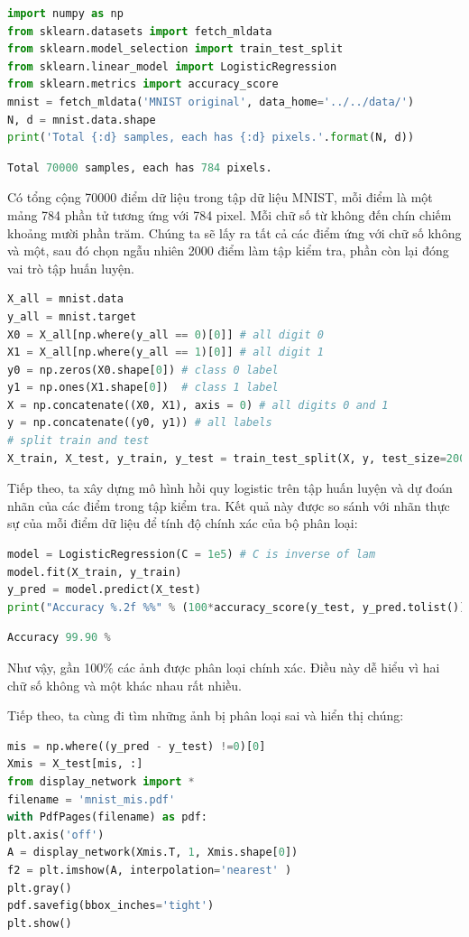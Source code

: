 \begin{lstlisting}[language=Python]
import numpy as np
from sklearn.datasets import fetch_mldata
from sklearn.model_selection import train_test_split
from sklearn.linear_model import LogisticRegression
from sklearn.metrics import accuracy_score
mnist = fetch_mldata('MNIST original', data_home='../../data/')
N, d = mnist.data.shape
print('Total {:d} samples, each has {:d} pixels.'.format(N, d))
\end{lstlisting}
\kq
\begin{lstlisting}[language=Python]
Total 70000 samples, each has 784 pixels.
\end{lstlisting}

Có tổng cộng 70000 điểm dữ liệu trong tập dữ liệu MNIST, mỗi điểm là một mảng
784 phần tử tương ứng với 784 pixel. Mỗi chữ số từ không đến chín chiếm khoảng
mười phần trăm. Chúng ta sẽ lấy ra tất cả các điểm ứng với chữ số không và một,
sau đó chọn ngẫu nhiên 2000 điểm làm tập kiểm tra, phần còn lại đóng vai trò
tập huấn luyện.
\begin{lstlisting}[language=Python]
X_all = mnist.data
y_all = mnist.target
X0 = X_all[np.where(y_all == 0)[0]] # all digit 0
X1 = X_all[np.where(y_all == 1)[0]] # all digit 1
y0 = np.zeros(X0.shape[0]) # class 0 label
y1 = np.ones(X1.shape[0])  # class 1 label
X = np.concatenate((X0, X1), axis = 0) # all digits 0 and 1
y = np.concatenate((y0, y1)) # all labels
# split train and test
X_train, X_test, y_train, y_test = train_test_split(X, y, test_size=2000)
\end{lstlisting}

Tiếp theo, ta xây dựng mô hình hồi quy logistic trên tập huấn luyện và dự
đoán nhãn của các điểm trong tập kiểm tra. Kết quả này được so sánh với nhãn
thực sự của mỗi điểm dữ liệu để tính độ chính xác của bộ phân loại:
\begin{lstlisting}[language=Python]
model = LogisticRegression(C = 1e5) # C is inverse of lam
model.fit(X_train, y_train)
y_pred = model.predict(X_test)
print("Accuracy %.2f %%" % (100*accuracy_score(y_test, y_pred.tolist())))
\end{lstlisting}
\kq
\begin{lstlisting}[language=Python]
Accuracy 99.90 %
\end{lstlisting}
Như vậy, gần 100\% các ảnh được phân loại chính xác. Điều này dễ hiểu vì hai
chữ số không và một khác nhau rất nhiều.

Tiếp theo, ta cùng đi tìm những ảnh bị phân loại sai và hiển thị chúng:
\begin{lstlisting}[language=Python]
mis = np.where((y_pred - y_test) !=0)[0]
Xmis = X_test[mis, :]
from display_network import *
filename = 'mnist_mis.pdf'
with PdfPages(filename) as pdf:
plt.axis('off')
A = display_network(Xmis.T, 1, Xmis.shape[0])
f2 = plt.imshow(A, interpolation='nearest' )
plt.gray()
pdf.savefig(bbox_inches='tight')
plt.show()
\end{lstlisting}

